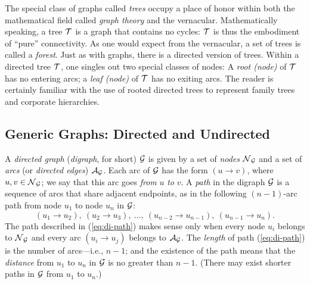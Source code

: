 The special class of graphs called {\it trees} 
 occupy a place of honor within both the mathematical
field called {\it graph theory} and the vernacular.  Mathematically
speaking, a tree $\mbox{$\cal T$}$ is a graph that contains no cycles: $\mbox{$\cal T$}$ is thus
the embodiment of ``pure'' connectivity.  As one would expect from the
vernacular, a set of trees is called a {\it forest}.  Just as with graphs, there is a directed version of trees.
Within a directed tree $\mbox{$\cal T$}$, one singles out two special classes of
nodes: A {\it root (node)}   of $\mbox{$\cal T$}$ has no entering arcs; a {\it leaf (node)}
  of $\mbox{$\cal T$}$
has no exiting arcs.  The reader is certainly familiar with the use of
rooted directed trees to represent family trees and corporate
hierarchies.

\subsection{Generic Graphs: Directed and Undirected}
\label{sec:digraphs}

A {\it directed graph}  ({\it digraph},
 for short) $\mbox{$\cal G$}$ is given by a set of {\it nodes}
$\mbox{$\cal N$}_{\mbox{{\scriptsize $\cal G$}}}$ and a set of {\it arcs}
(or {\it directed edges}) $\mbox{$\cal A$}_{\mbox{{\scriptsize $\cal G$}}}$.
Each arc of $\mbox{$\cal G$}$ has the form $(u \rightarrow v)$,
where $u, v \in \mbox{$\cal N$}_{\mbox{{\scriptsize $\cal G$}}}$; we say that this arc goes {\em from} $u$
{\em to} $v$.  A {\it path} 
in the digraph $\mbox{$\cal G$}$ is a sequence of arcs that share adjacent
endpoints, as in the following $(n-1)$-arc path from node $u_1$ to
node $u_n$ in $\mbox{$\cal G$}$:
\begin{equation}
\label{eq:di-path}
(u_1 \rightarrow u_2), \ (u_2 \rightarrow u_3), \ \ldots, \ (u_{n-2}
        \rightarrow u_{n-1}), \ (u_{n-1} \rightarrow u_n).
\end{equation}
The path described in (\ref{eq:di-path}) makes sense only when every
node $u_i$ belongs to $\mbox{$\cal N$}_{\mbox{{\scriptsize $\cal G$}}}$ and every arc $(u_i \rightarrow u_j)$
belongs to $\mbox{$\cal A$}_{\mbox{{\scriptsize $\cal G$}}}$.  The {\it length} of path (\ref{eq:di-path}) is
the number of arcs---i.e., $n-1$; and the existence of the path means
that the {\it distance} 
  from
$u_1$ to $u_n$ in $\mbox{$\cal G$}$ is no greater than $n-1$.   (There may exist
shorter paths in $\mbox{$\cal G$}$ from $u_1$ to $u_n$.)

